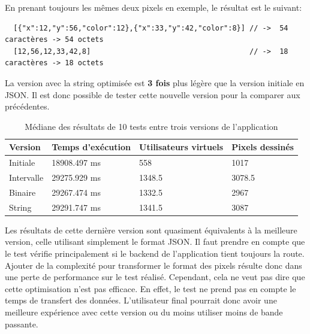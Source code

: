 En prenant toujours les mêmes deux pixels en exemple, le résultat est le suivant:

\begin{verbatim}
  [{"x":12,"y":56,"color":12},{"x":33,"y":42,"color":8}] // ->  54 caractères -> 54 octets
  [12,56,12,33,42,8]                                     // ->  18 caractères -> 18 octets
\end{verbatim}

La version avec la string optimisée est \textbf{3 fois} plus légère que la version initiale en JSON. Il est donc possible de tester cette nouvelle version pour la comparer aux précédentes.

\begin{table}[H]
  \centering
  \begin{tabular}{|l|l|l|l|}
    \hline
    \textbf{Version} & \textbf{Temps d'exécution} & \textbf{Utilisateurs virtuels} & \textbf{Pixels dessinés} \\ \hline
    Initiale         & 18908.497 ms               & 558                            & 1017                     \\ \hline
    Intervalle       & 29275.929 ms               & 1348.5                         & 3078.5                   \\ \hline
    Binaire          & 29267.474 ms               & 1332.5                         & 2967                     \\ \hline
    String           & 29291.747 ms               & 1341.5                         & 3087                     \\ \hline
  \end{tabular}
  \caption{Médiane des résultats de 10 tests entre trois versions de l'application}
  \label{table:third-opti-results}
\end{table}

Les résultats de cette dernière version sont quasiment équivalents à la meilleure version, celle utilisant simplement le format JSON. Il faut prendre en compte que le test vérifie principalement si le backend de l'application tient toujours la route. Ajouter de la complexité pour transformer le format des pixels résulte donc dans une perte de performance sur le test réalisé. Cependant, cela ne veut pas dire que cette optimisation n'est pas efficace. En effet, le test ne prend pas en compte le temps de transfert des données. L'utilisateur final pourrait donc avoir une meilleure expérience avec cette version ou du moins utiliser moins de bande passante.

